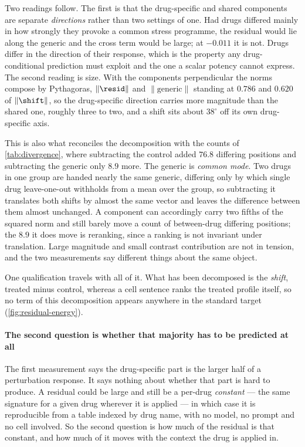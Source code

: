 Two readings follow. The first is that the drug-specific and shared components are
separate \emph{directions} rather than two settings of one. Had drugs differed
mainly in how strongly they provoke a common stress programme, the residual would
lie along the generic and the cross term would be large; at $-0.011$ it is not.
Drugs differ in the direction of their response, which is the property any
drug-conditional prediction must exploit and the one a scalar potency cannot
express. The second reading is size. With the components perpendicular the norms
compose by Pythagoras, $\lVert \resid \rVert$ and $\lVert \textrm{generic} \rVert$
standing at $0.786$ and $0.620$ of $\lVert \shift \rVert$, so the drug-specific
direction carries more magnitude than the shared one, roughly three to two, and a
shift sits about $38^{\circ}$ off its own drug-specific axis.

This is also what reconciles the decomposition with the counts of
\cref{tab:divergence}, where subtracting the control added $76.8$ differing
positions and subtracting the generic only $8.9$ more. The generic is
\emph{common mode}. Two drugs in one group are handed nearly the same generic,
differing only by which single drug leave-one-out withholds from a mean over the
group, so subtracting it translates both shifts by almost the same vector and
leaves the difference between them almost unchanged. A component can accordingly
carry two fifths of the squared norm and still barely move a count of between-drug
differing positions; the $8.9$ it does move is reranking, since a ranking is not
invariant under translation. Large magnitude and small contrast contribution are
not in tension, and the two measurements say different things about the same
object.

One qualification travels with all of it. What has been decomposed is the
\emph{shift}, treated minus control, whereas a cell sentence ranks the treated
profile itself, so no term of this decomposition appears anywhere in the standard
target (\cref{fig:residual-energy}).




\paragraph{The second question is whether that majority has to be predicted at all}
The first measurement says the drug-specific part is the larger half of a
perturbation response. It says nothing about whether that part is hard to produce.
A residual could be large and still be a per-drug \emph{constant} --- the same
signature for a given drug wherever it is applied --- in which case it is
reproducible from a table indexed by drug name, with no model, no prompt and no
cell involved. So the second question is how much of the residual is that
constant, and how much of it moves with the context the drug is applied in.

